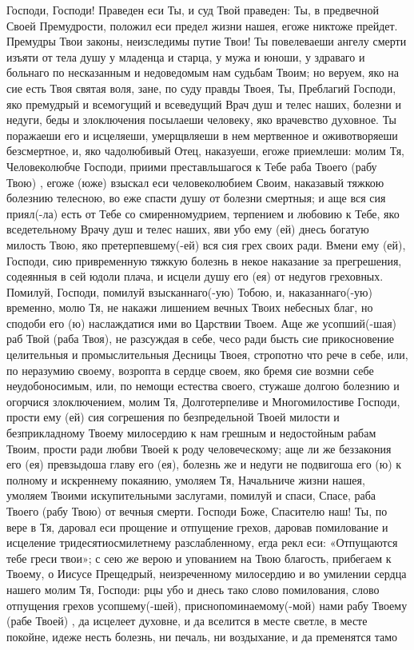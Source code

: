 \mychapterending

\begin{mymulticols}


Господи, Господи! Праведен еси Ты, и суд Твой праведен: Ты, в предвечной Своей Премудрости, положил еси предел жизни нашея, егоже никтоже прейдет. Премудры Твои законы, неизследимы путие Твои! Ты повелеваеши ангелу смерти изъяти от тела душу у младенца и старца, у мужа и юноши, у здраваго и больнаго по несказанным и недоведомым нам судьбам Твоим; но веруем, яко на сие есть Твоя святая воля, зане, по суду правды Твоея, Ты, Преблагий Господи, яко премудрый и всемогущий и всеведущий Врач душ и телес наших, болезни и недуги, беды и злоключения посылаеши человеку, яко врачевство духовное. Ты поражаеши его и исцеляеши, умерщвляеши в нем мертвенное и оживотворяеши безсмертное, и, яко чадолюбивый Отец, наказуеши, егоже приемлеши: молим Тя, Человеколюбче Господи, приими преставльшагося к Тебе раба Твоего (рабу Твою) , егоже (юже) взыскал еси человеколюбием Своим, наказавый тяжкою болезнию телесною, во еже спасти душу от болезни смертныя; и аще вся сия приял(-ла) есть от Тебе со смиренномудрием, терпением и любовию к Тебе, яко вседетельному Врачу душ и телес наших, яви убо ему (ей) днесь богатую милость Твою, яко претерпевшему(-ей) вся сия грех своих ради. Вмени ему (ей), Господи, сию привременную тяжкую болезнь в некое наказание за прегрешения, содеянныя в сей юдоли плача, и исцели душу его (ея) от недугов греховных. Помилуй, Господи, помилуй взысканнаго(-ую) Тобою, и, наказаннаго(-ую) временно, молю Тя, не накажи лишением вечных Твоих небесных благ, но сподоби его (ю) наслаждатися ими во Царствии Твоем. Аще же усопший(-шая) раб Твой (раба Твоя), не разсуждая в себе, чесо ради бысть сие прикосновение целительныя и промыслительныя Десницы Твоея, стропотно что рече в себе, или, по неразумию своему, возропта в сердце своем, яко бремя сие возмни себе неудобоносимым, или, по немощи естества своего, стужаше долгою болезнию и огорчися злоключением, молим Тя, Долготерпеливе и Многомилостиве Господи, прости ему (ей) сия согрешения по безпредельной Твоей милости и безприкладному Твоему милосердию к нам грешным и недостойным рабам Твоим, прости ради любви Твоей к роду человеческому; аще ли же беззакония его (ея) превзыдоша главу его (ея), болезнь же и недуги не подвигоша его (ю) к полному и искреннему покаянию, умоляем Тя, Начальниче жизни нашея, умоляем Твоими искупительными заслугами, помилуй и спаси, Спасе, раба Твоего (рабу Твою) от вечныя смерти. Господи Боже, Спасителю наш! Ты, по вере в Тя, даровал еси прощение и отпущение грехов, даровав помилование и исцеление тридесятиосмилетнему разслабленному, егда рекл еси: «Отпущаются тебе греси твои»; с сею же верою и упованием на Твою благость, прибегаем к Твоему, о Иисусе Прещедрый, неизреченному милосердию и во умилении сердца нашего молим Тя, Господи: рцы убо и днесь тако слово помилования, слово отпущения грехов усопшему(-шей), приснопоминаемому(-мой) нами рабу Твоему (рабе Твоей) , да исцелеет духовне, и да вселится в месте светле, в месте покойне, идеже несть болезнь, ни печаль, ни воздыхание, и да пременятся тамо 
\end{mymulticols}
